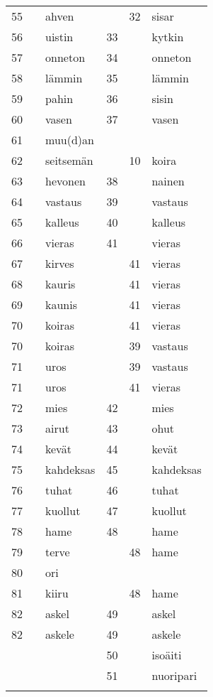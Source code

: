 \begin{longtable}{@{}rrlrrl}
55 &    & ahven     &    & 32 & sisar \\
56 &    & uistin    & 33 &    & kytkin \\
57 &    & onneton   & 34 &    & onneton \\
58 &    & lämmin    & 35 &    & lämmin \\
59 &    & pahin     & 36 &    & sisin \\
60 &    & vasen     & 37 &    & vasen \\
61 &    & muu(d)an  &    &    &  \\
62 &    & seitsemän &    & 10 & koira \\
63 &    & hevonen   & 38 &    & nainen \\
64 &    & vastaus   & 39 &    & vastaus \\
65 &    & kalleus   & 40 &    & kalleus \\
66 &    & vieras    & 41 &    & vieras \\
67 &    & kirves    &    & 41 & vieras \\
68 &    & kauris    &    & 41 & vieras \\
69 &    & kaunis    &    & 41 & vieras \\
70 &    & koiras    &    & 41 & vieras \\
70 &    & koiras    &    & 39 & vastaus \\
71 &    & uros      &    & 39 & vastaus \\
71 &    & uros      &    & 41 & vieras \\
72 &    & mies      & 42 &    & mies \\
73 &    & airut     & 43 &    & ohut \\
74 &    & kevät     & 44 &    & kevät \\
75 &    & kahdeksas & 45 &    & kahdeksas \\
76 &    & tuhat     & 46 &    & tuhat \\
77 &    & kuollut   & 47 &    & kuollut \\
78 &    & hame      & 48 &    & hame \\
79 &    & terve     &    & 48 & hame \\
80 &    & ori       &    &    &  \\
81 &    & kiiru     &    & 48 & hame \\
82 &    & askel     & 49 &    & askel \\
82 &    & askele    & 49 &    & askele \\
   &    &           & 50 &    & isoäiti \\
   &    &           & 51 &    & nuoripari \\
   &    &           &    &    & \\    



\end{longtable}
